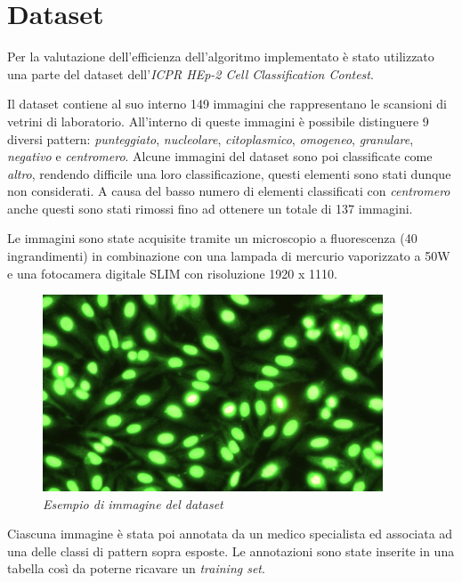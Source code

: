 \section{Dataset}

Per la valutazione dell'efficienza dell'algoritmo implementato è stato utilizzato una parte del dataset dell'\emph{ICPR HEp-2 Cell Classification Contest}.

Il dataset contiene al suo interno 149 immagini che rappresentano le scansioni di vetrini di laboratorio. All'interno di queste immagini è possibile distinguere 9 diversi pattern: \emph{punteggiato}, \emph{nucleolare}, \emph{citoplasmico}, \emph{omogeneo}, \emph{granulare}, \emph{negativo} e \emph{centromero}. Alcune immagini del dataset sono poi classificate come \emph{altro}, rendendo difficile una loro classificazione, questi elementi sono stati dunque non considerati. A causa del basso numero di elementi classificati con \emph{centromero} anche questi sono stati rimossi fino ad ottenere un totale di 137 immagini.

Le immagini sono state acquisite tramite un microscopio a fluorescenza (40 ingrandimenti) in combinazione con una lampada di mercurio vaporizzato a 50W e una fotocamera digitale SLIM con risoluzione 1920 x 1110.

\begin{figure}[H] 
  \centering
    \includegraphics[width=0.9\textwidth]{images/example.jpg}
    \caption{{\small \textit{Esempio di immagine del dataset}}}
\end{figure}

Ciascuna immagine è stata poi annotata da un medico specialista ed associata ad una delle classi di pattern sopra esposte. Le annotazioni sono state inserite in una tabella così da poterne ricavare un \emph{training set}.

